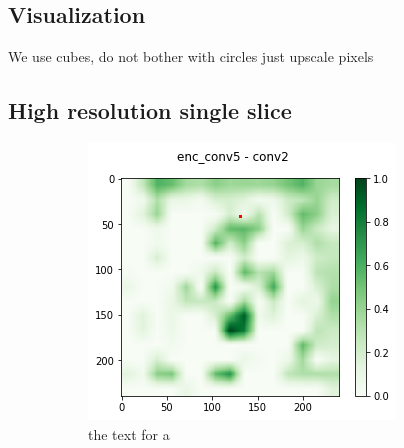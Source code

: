 \subsection{Visualization}
We use cubes, do not bother with circles just upscale pixels

\subsection{High resolution single slice}

\begin{figure}[H]
    \centering
    \begin{subfigure}{.33\textwidth}
        \centering
        \includegraphics[width=\linewidth]{chapters/04_segmentation/images/grad_cam_17.png}
        \caption{ the text for a}
    \end{subfigure}%
    \begin{subfigure}{.33\textwidth}
        \centering

\end{subfigure}
\end{figure}
